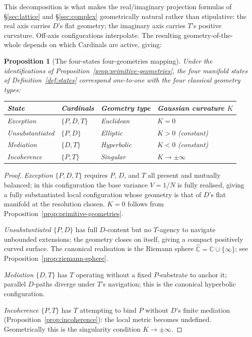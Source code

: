 \documentclass[11pt,a4paper]{article}
\newtheorem{proposition}[theorem]{Proposition}
\theoremstyle{definition}
\theoremstyle{remark}
\newcommand{\C}{\mathbb{C}}
\begin{document}
This decomposition is what makes the real/imaginary projection formulas of \S\ref{sec:lattice} and \S\ref{sec:complex} geometrically natural rather than stipulative: the real axis carries $D$'s flat geometry; the imaginary axis carries $T$'s positive curvature. Off-axis configurations interpolate. The resulting geometry-of-the-whole depends on which Cardinals are active, giving:

\begin{proposition}[The four-states four-geometries mapping]\label{prop:states-geometries}
Under the identifications of Proposition~\ref{prop:primitive-geometries}, the four manifold states of Definition~\ref{def:states} correspond one-to-one with the four classical geometry types:
\begin{center}
\begin{tabular}{@{}llll@{}}
\toprule
\emph{State} & \emph{Cardinals} & \emph{Geometry type} & \emph{Gaussian curvature} $K$ \\
\midrule
Exception     & $\{P,D,T\}$ & Euclidean  & $K = 0$ \\
Unsubstantiated & $\{P,D\}$ & Elliptic   & $K > 0$ (constant) \\
Mediation     & $\{D,T\}$  & Hyperbolic & $K < 0$ (constant) \\
Incoherence   & $\{P,T\}$  & Singular   & $K \to \pm\infty$ \\
\bottomrule
\end{tabular}
\end{center}
\end{proposition}

\begin{proof}
\emph{Exception $\{P,D,T\}$} requires $P$, $D$, and $T$ all present and mutually balanced; in this configuration the base variance $V = 1/N$ is fully realised, giving a fully substantiated local configuration whose geometry is that of $D$'s flat manifold at the resolution chosen. $K = 0$ follows from Proposition~\ref{prop:primitive-geometries}.

\emph{Unsubstantiated $\{P,D\}$} has full $D$-content but no $T$-agency to navigate unbounded extensions; the geometry closes on itself, giving a compact positively curved surface. The canonical realisation is the Riemann sphere $\widehat{\C} = \C\cup\{\infty\}$; see Proposition~\ref{prop:riemann-sphere}.

\emph{Mediation $\{D,T\}$} has $T$ operating without a fixed $P$-substrate to anchor it; parallel $D$-paths diverge under $T$'s navigation; this is the canonical hyperbolic configuration.

\emph{Incoherence $\{P,T\}$} has $T$ attempting to bind $P$ without $D$'s finite mediation (Proposition~\ref{prop:incoherence}): the local metric becomes undefined. Geometrically this is the singularity condition $K \to \pm\infty$.
\end{proof}
\end{document}
